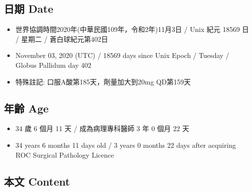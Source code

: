 \documentclass[
]{article}
\providecommand{\tightlist}{%
  \setlength{\itemsep}{0pt}\setlength{\parskip}{0pt}}
\begin{document}
\hypertarget{ux65e5ux671f-date-2}{%
\subsection{日期 Date}\label{ux65e5ux671f-date-2}}

\begin{itemize}
\tightlist
\item
  世界協調時間2020年(中華民國109年，令和2年)11月3日 / Unix 紀元 18569 日
  / 星期二 / 蒼白球紀元第402日
\item
  November 03, 2020 (UTC) / 18569 days since Unix Epoch / Tuesday /
  Globus Pallidum day 402
\item
  特殊註記: 口服A酸第185天，劑量加大到20mg QD第159天
\end{itemize}

\hypertarget{ux5e74ux9f61-age-2}{%
\subsection{年齡 Age}\label{ux5e74ux9f61-age-2}}

\begin{itemize}
\tightlist
\item
  34 歲 6 個月 11 天 / 成為病理專科醫師 3 年 0 個月 22 天
\item
  34 years 6 months 11 days old / 3 years 0 months 22 days after
  acquiring ROC Surgical Pathology Licence
\end{itemize}

\hypertarget{ux672cux6587-content-2}{%
\subsection{本文 Content}\label{ux672cux6587-content-2}}
\end{document}
